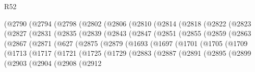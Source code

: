 \begin{lexlean}{R52}
\begin{coremodule}
{{{{{{{{{{{{{{{{{{{{{{{{{{{{{{{{{{{{{{{{{{{{{{{{{{{{{{{{{{{{{{{{{{{{{{{{{{{{{{{{{{{{{{{{{{{{{{{{{{{{{{{{{{{{{{{{{{{{{{{{{{{{{{{{{{{{{{{{{{{{{{{{{{{{{{{{{{{{{{{{{{{{{{{{{{{{{{{{{{{{{{{{{{{{{{{{{{{{{{          (@2790
            (@2794
              (@2798
                (@2802
                  (@2806
                    (@2810
                      (@2814
                        (@2818
                          (@2822
                            (@2823
                              (@2827
                                (@2831
                                  (@2835
                                    (@2839
                                      (@2843
                                        (@2847
                                          (@2851
                                            (@2855
                                              (@2859
                                                (@2863
                                                  (@2867
                                                    (@2871
                                                      (@627
                                                        (@2875
                                                          (@2879
                                                            (@1693
                                                              (@1697
                                                                (@1701
                                                                  (@1705
                                                                    (@1709
                                                                      (@1713
                                                                        (@1717
                                                                          (@1721
                                                                            (@1725
                                                                              (@1729
                                                                                (@2883
                                                                                  (@2887
                                                                                    (@2891
                                                                                      (@2895
                                                                                        (@2899
                                                                                          (@2903
                                                                                            (@2904
                                                                                              (@2908
                                                                                                (@2912
}}}}}}}}}}}}}}}}}}}}}}}}}}}}}}}}}}}}}}}}}}}}}}}}}}}}}}}}}}}}}}}}}}}}}}}}}}}}}}}}}}}}}}}}}}}}}}}}}}}}}}}}}}}}}}}}}}}}}}}}}}}}}}}}}}}}}}}}}}}}}}}}}}}}}}}}}}}}}}}}}}}}}}}}}}}}}}}}}}}}}}}}}}}}}}}}}}}}}}
\end{coremodule}
\end{lexlean}
